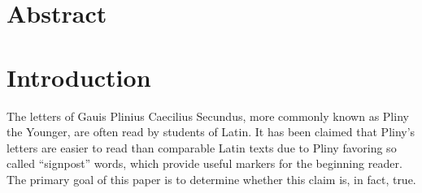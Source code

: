 \section{Abstract}
    

\section{Introduction}
\label{sec:Intro}

The letters of Gauis Plinius Caecilius Secundus, more commonly known as Pliny the Younger, are often read by students of Latin.  It has been claimed \cite{Woodmanpm} that Pliny's letters are easier to read than comparable Latin texts due to Pliny favoring so called ``signpost'' words, which provide useful markers for the beginning reader. The primary goal of this paper is to determine whether this claim is, in fact, true.

